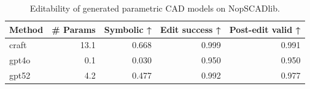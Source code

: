 \begin{table}[t]
\centering
\caption{Editability of generated parametric CAD models on NopSCADlib.}
\label{tab:editability}
\begin{tabular}{lrrrr}
\toprule
Method & \# Params & Symbolic ↑ & Edit success ↑ & Post-edit valid ↑ \\
\midrule
craft & 13.1 & 0.668 & 0.999 & 0.991 \\
gpt4o & 0.1 & 0.030 & 0.950 & 0.950 \\
gpt52 & 4.2 & 0.477 & 0.992 & 0.977 \\
\bottomrule
\end{tabular}
\end{table}
